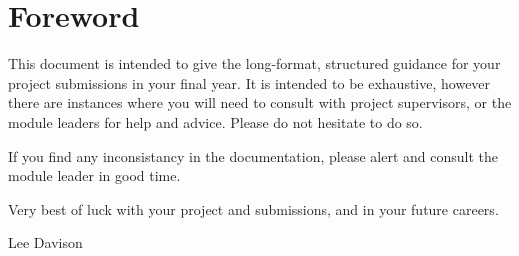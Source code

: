 \chapter{Foreword}

This document is intended to give the long-format, structured guidance for your project submissions in your final year. It is intended to be exhaustive, however there are instances where you will need to consult with project supervisors, or the module leaders for help and advice. Please do not hesitate to do so. 

If you find any inconsistancy in the documentation, please alert and consult the module leader in good time. 

Very best of luck with your project and submissions, and in your future careers.

\medskip

Lee Davison

